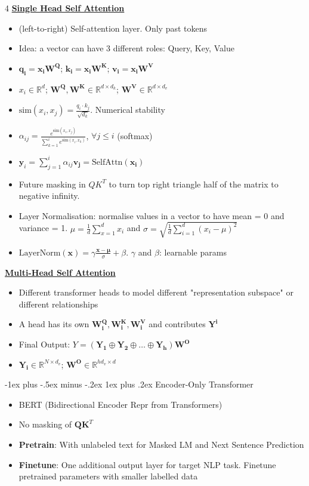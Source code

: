 \documentclass[10pt, landscape]{article}
\makeatletter
\renewcommand{\subsubsection}{\@startsection{subsubsection}{3}{0mm}%
  {-1ex plus -.5ex minus -.2ex}%
  {1ex plus .2ex}%
{\normalfont\small\bfseries}}%
\makeatother
\begin{document}
\begin{multicols*}{4}
  \textbf{\underline{Single Head Self Attention}}
  \begin{itemize}
    \item (left-to-right) Self-attention layer. Only past tokens
    \item Idea: a vector can have 3 different roles: Query, Key, Value
    \item $\mathbf{q_i = x_i W^Q}$; $\mathbf{k_i = x_i W^K}$;  $\mathbf{v_i = x_i W^V}$
    \item $x_i \in \mathbb{R}^d$; $\mathbf{W^Q, W^K} \in \mathbb{R}^{d \times d_k}$; $\mathbf{W^V} \in \mathbb{R}^{d \times d_v}$
    \item $\text{sim}(x_i, x_j) = \frac{q_i \cdot k_j}{\sqrt{d_k}}$. Numerical stability
    \item $\alpha_{ij} = \frac{e^{\text{sim}(x_i, x_j)}}{\sum_{k=1}^{i} e^{\text{sim}(x_i, x_k)}}$, $\forall j \leq i$ (softmax)
    \item $\mathbf{y}_i = \sum_{j=1}^{i} \alpha_{ij}\mathbf{v_j} = \text{SelfAttn}(\mathbf{x_i})$
    \item Future masking in $QK^T$ to turn top right triangle half of the matrix to negative infinity.
    \item Layer Normalisation: normalise values in a vector to have mean = 0 and variance = 1.
    $\mu = \frac{1}{d} \sum_{x=1}^d x_i$ and $\sigma = \sqrt{\frac{1}{d} \sum_{i=1}^d (x_i - \mu)^2}$
    \item $\text{LayerNorm}(\mathbf{x}) = \gamma \frac{\mathbf{x- \mu}}{\sigma} + \beta$. $\gamma$ and $\beta$: learnable params
  \end{itemize}

  \textbf{\underline{Multi-Head Self Attention}}
  \begin{itemize}
    \item Different transformer heads to model different "representation subspace" or different relationships
    \item A head has its own $\mathbf{W_i^Q, W_i^K, W_i^V}$  and contributes $\mathbf{Y^i}$
    \item Final Output: $Y = (\mathbf{Y_1 \oplus Y_2 \oplus \dots \oplus Y_h})\mathbf{W^O}$
    \item $\mathbf{Y_i} \in \mathbb{R}^{N \times d_v}$; $\mathbf{W^O} \in \mathbb{R}^{hd_v \times d}$
  \end{itemize}

  \subsubsection{Encoder-Only Transformer}
  \begin{itemize}
    \item BERT (Bidirectional Encoder Repr from Transformers)
    \item No masking of $\mathbf{QK}^T$
    \item \textbf{Pretrain}: With unlabeled text for Masked LM and Next Sentence Prediction
    \item \textbf{Finetune}: One additional output layer for target NLP task. Finetune pretrained parameters with smaller labelled data 
  \end{itemize}


\end{multicols*}
\end{document}
